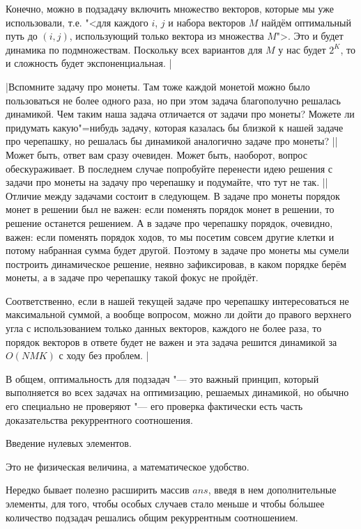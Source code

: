 Конечно, можно в подзадачу включить множество векторов, которые мы уже использовали, т.е. "<для каждого $i$, $j$ и набора векторов $M$ найдём оптимальный путь до $(i,j)$, использующий только вектора из множества $M$">. Это и будет динамика по подмножествам. Поскольку всех вариантов для $M$ у нас будет $2^K$, то и сложность будет экспоненциальная.
|

\task|Вспомните задачу про монеты. Там тоже каждой монетой можно было пользоваться не более одного раза,
но при этом задача благополучно решалась динамикой. Чем таким наша задача отличается от задачи про монеты?
Можете ли придумать какую"=нибудь задачу, которая казалась бы близкой к нашей задаче про черепашку, но решалась
бы динамикой аналогично задаче про монеты?
||Может быть, ответ вам сразу очевиден. Может быть, наоборот, вопрос обескураживает. В последнем случае попробуйте перенести идею решения с задачи про монеты на задачу про черепашку и подумайте, что тут не так.
||Отличие между задачами состоит в следующем. В задаче про монеты порядок монет в решении был не важен: если поменять порядок монет в решении, то решение останется решением. А в задаче про черепашку порядок, очевидно, важен: если поменять порядок ходов, то мы посетим совсем другие клетки и потому набранная сумма будет другой. Поэтому в задаче про монеты мы  сумели построить динамическое решение, неявно зафиксировав, в каком порядке берём монеты, а в задаче про черепашку такой фокус не пройдёт.

Соответственно, если в нашей текущей задаче про черепашку интересоваться не максимальной суммой, а вообще вопросом, можно ли дойти до правого верхнего угла с использованием только данных векторов, каждого не более раза, то порядок векторов в ответе будет не важен и эта задача решится динамикой за $O(NMK)$ с ходу без проблем.
|

В общем, оптимальность для подзадач "--- это важный принцип, который выполняется во всех задачах на оптимизацию,
решаемых динамикой, но обычно его специально не проверяют "--- его проверка фактически есть часть доказательства 
рекуррентного соотношения.

\llheader Введение нулевых элементов. 

\epigraph{Это не физическая величина, а математическое удобство.}{}\nopagebreak

Нередко бывает полезно расширить массив $ans$, введя в нем дополнительные элементы, для того, чтобы особых случаев стало меньше и чтобы б\'{о}льшее количество подзадач решались общим рекуррентным соотношением.

